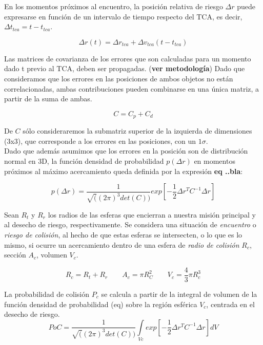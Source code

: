 En los momentos pr\'oximos al encuentro, la posici\'on relativa de riesgo $\Delta r$ puede expresarse en funci\'on de un intervalo de tiempo respecto del TCA, es decir, $\Delta t_{tca}=t-t_{tca}$.

\begin{equation}
\Delta r(t)=\Delta r_{tca}+\Delta v_{tca}(t-t_{tca})
\end{equation}

Las matrices de covarianza de los errores que son calculadas para un momento dado t previo al TCA, deben ser propagadas. ({\bf{ver metodolog\'ia}})
Dado que consideramos que los errores en las posiciones de ambos objetos no est\'an correlacionadas, ambas contribuciones pueden combinarse en una \'unica matriz, a partir de la suma de ambas.

\begin{equation}
C=C_{p}+C_{d}
\end{equation}

De $C$ s\'olo consideraremos la submatriz superior de la izquierda de dimensiones (3x3), que corresponde a los errores en las posiciones, con un $1 \sigma$.\\
Dado que adem\'as asumimos que los errores en la posici\'on son de distribuci\'on normal en 3D, la funci\'on densidad de probabilidad $p(\Delta r)$ en momentos pr\'oximos al m\'aximo acercamiento queda definida por la expresi\'on {\bf{eq ..bla}}:

\begin{equation}
p(\Delta r)=\frac{1}{\sqrt((2 \pi)^3det(C))} exp[-\frac{1}{2}\Delta r^TC^{-1}\Delta r]
\end{equation}

Sean $R_{t}$ y $R_{r}$ los radios de las esferas que encierran a nuestra misi\'on principal y al desecho de riesgo, respectivamente. Se considera una situaci\'on de {\it{encuentro}} o {\it{riesgo de colisi\'on}}, al hecho de que estas esferas se intersecten, o lo que es lo mismo, si ocurre un acercamiento dentro de una esfera de {\it{radio de colisi\'on}} $R_{c}$, secci\'on $A_{c}$,  volumen $V_{c}$.

\begin{equation}
R_{c}=R_{t}+R_{r} \qquad A_{c}=\pi R_{C}^{2} \qquad V_{c}=\frac{4}{3} \pi R_{c}^{3}
\end{equation}

La probabilidad de colisi\'on $P_{c}$ se calcula a partir de la integral de volumen de la funci\'on densidad de probabilidad (eq) sobre la regi\'on esf\'erica $V_{c}$, centrada en el desecho de riesgo.
\begin{equation}
PoC=\frac{1}{\sqrt((2\pi)^3det(C))} \int \limits_{Vc} exp[-\frac{1}{2}\Delta r^TC^{-1}\Delta r]dV
\label{eq:poc3d}
\end{equation}

